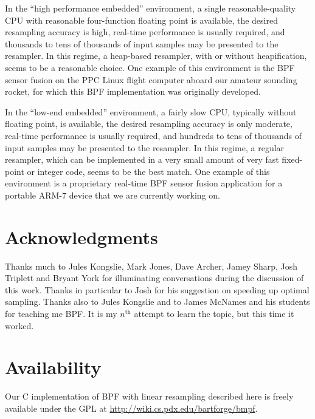 \documentclass[12pt]{article}
\begin{document}
  In the ``high performance embedded'' environment, a single
  reasonable-quality CPU with reasonable four-function
  floating point is available, the desired resampling
  accuracy is high, real-time performance is usually
  required, and thousands to tens of thousands of input
  samples may be presented to the resampler.  In this
  regime, a heap-based resampler, with or without heapification, seems
  to be a reasonable choice.  One example of this
  environment is the BPF sensor fusion on the PPC Linux
  flight computer aboard our amateur sounding rocket, for
  which this BPF implementation was originally developed.

  In the ``low-end embedded'' environment, a fairly slow
  CPU, typically without floating point, is available, the
  desired resampling accuracy is only moderate, real-time
  performance is usually required, and hundreds to tens of
  thousands of input samples may be presented to the
  resampler.  In this regime, a regular resampler, which
  can be implemented in a very small amount of very fast
  fixed-point or integer code, seems to be the best match.
  One example of this environment is a proprietary real-time
  BPF sensor fusion application for a portable ARM-7 device
  that we are currently working on.

\section*{Acknowledgments}

  Thanks much to Jules Kongslie, Mark Jones, Dave Archer,
  Jamey Sharp, Josh Triplett and Bryant York for
  illuminating conversations during the discussion of this
  work.  Thanks in particular to Josh for his suggestion on
  speeding up optimal sampling.  Thanks also to Jules
  Kongslie and to James McNames and his students for
  teaching me BPF.  It is my $n^{\text{th}}$ attempt to
  learn the topic, but this time it worked.

\section*{Availability}

  Our C implementation of BPF with linear resampling
  described here is freely available under the GPL at
  \url{http://wiki.cs.pdx.edu/bartforge/bmpf}.



\end{document}
